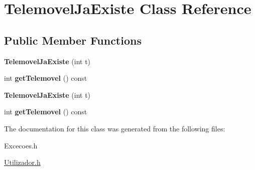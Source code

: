 \hypertarget{class_telemovel_ja_existe}{}\section{Telemovel\+Ja\+Existe Class Reference}
\label{class_telemovel_ja_existe}
\subsection*{Public Member Functions}
\begin{DoxyCompactItemize}
\item 
\hypertarget{class_telemovel_ja_existe_a1b8b5f81036630c96adef3460fa2686c}{}{\bfseries Telemovel\+Ja\+Existe} (int t)\label{class_telemovel_ja_existe_a1b8b5f81036630c96adef3460fa2686c}

\item 
\hypertarget{class_telemovel_ja_existe_a752ff5fc0531887eec1d0dc78c5a91c4}{}int {\bfseries get\+Telemovel} () const \label{class_telemovel_ja_existe_a752ff5fc0531887eec1d0dc78c5a91c4}

\item 
\hypertarget{class_telemovel_ja_existe_a1b8b5f81036630c96adef3460fa2686c}{}{\bfseries Telemovel\+Ja\+Existe} (int t)\label{class_telemovel_ja_existe_a1b8b5f81036630c96adef3460fa2686c}

\item 
\hypertarget{class_telemovel_ja_existe_a752ff5fc0531887eec1d0dc78c5a91c4}{}int {\bfseries get\+Telemovel} () const \label{class_telemovel_ja_existe_a752ff5fc0531887eec1d0dc78c5a91c4}

\end{DoxyCompactItemize}


The documentation for this class was generated from the following files\+:\begin{DoxyCompactItemize}
\item 
Excecoes.\+h\item 
\hyperlink{_utilizador_8h}{Utilizador.\+h}\end{DoxyCompactItemize}
